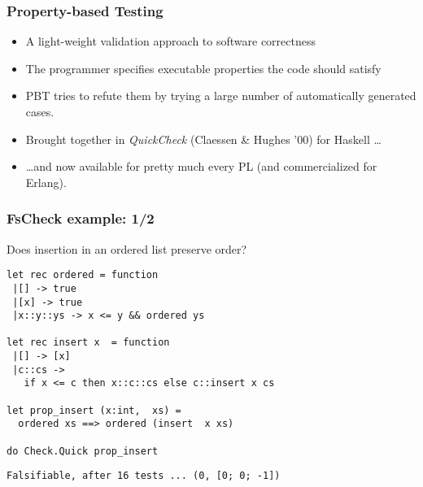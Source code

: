 \documentclass{beamer}
\begin{document}
\begin{frame}[fragile]\frametitle{Property-based Testing}
  \begin{itemize}
  \item A light-weight validation approach to software correctness
  \item The programmer specifies executable properties  the code should satisfy
  \item PBT tries to refute them  by trying a  large number of
    automatically generated cases.
    \pause
     \item Brought together in \emph{QuickCheck} (Claessen \& Hughes '00) for Haskell \dots
       
     \item \dots and now available for pretty much every PL (and
       commercialized for Erlang).
  \end{itemize}


\end{frame}

\begin{frame}[fragile]
  \frametitle{FsCheck example: 1/2}
  Does insertion in an ordered list preserve order?
  \begin{small}
    \begin{lstlisting}
let rec ordered = function                      
 |[] -> true
 |[x] -> true
 |x::y::ys -> x <= y && ordered ys  

let rec insert x  = function 
 |[] -> [x]
 |c::cs -> 
   if x <= c then x::c::cs else c::insert x cs
 
let prop_insert (x:int,  xs) =  
  ordered xs ==> ordered (insert  x xs)

do Check.Quick prop_insert
    \end{lstlisting}
  \end{small}

\pause
  \begin{small}
    \begin{lstlisting}
Falsifiable, after 16 tests ... (0, [0; 0; -1])
    \end{lstlisting}
  \end{small}
\end{frame}
\end{document}
